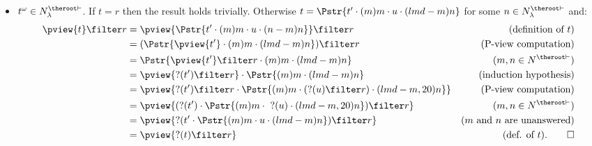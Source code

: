 \begin{itemize}
\item $t^\omega \in N^{\theroot\vdash}_\lambda$. If $t=r$ then the result holds trivially.
Otherwise $t =  \Pstr{t' \cdot (m){m} \cdot u \cdot
(lmd-m){n}}$ for some $n\in
    N^{\theroot \vdash}_\lambda$ and:
        \begin{align*}
        \pview{t} \filter  r
        &= \pview{\Pstr{t' \cdot (m){m} \cdot u \cdot (n-m){n}}} \filter  r & (\mbox{definition of } t)\\
        &= (\Pstr{\pview{t'} \cdot (m){m} \cdot  (lmd-m){n}} ) \filter  r & (\mbox{P-view computation}) \\
        &= \Pstr{\pview{t'} \filter  r \cdot (m){m} \cdot  (lmd-m){n}} & (m, n \in N^{\theroot \vdash}) \\
        &= \pview{?(t')\filter r}  \cdot \Pstr{(m){m} \cdot  (lmd-m){n}} & \mbox{(induction hypothesis)} \\
        &= \pview{ ?(t') \filter r \cdot \Pstr{(m){m} \cdot {(?(u) \filter r)} \cdot (lmd-m,20){n}}}
& (\mbox{P-view computation}) \\
        &= \pview{ (?(t') \cdot \Pstr{(m){m} \cdot\ {?(u)} \cdot (lmd-m,20){n}}) \filter r }
& (m, n \in N^{\theroot \vdash}) \\
        &= \pview{ ?(t' \cdot \Pstr{(m){m} \cdot u \cdot (lmd-m){n}}) \filter r }
& \mbox{($m$ and $n$ are unanswered)} \\
        &= \pview{ ?(t) \filter r }                & \mbox{(def. of $t$).} \qed
        \end{align*}
\end{itemize}





